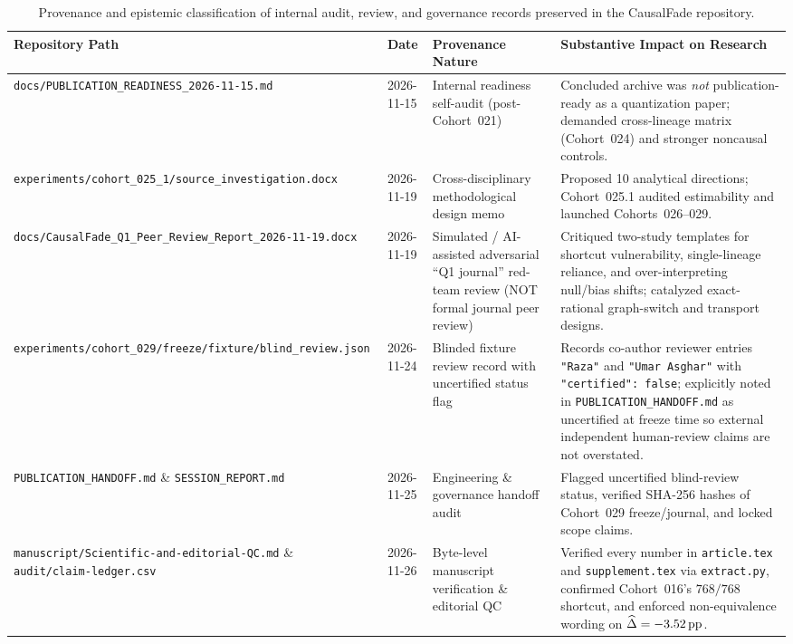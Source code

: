 \begin{table}[htbp]
\centering
\footnotesize
\caption{Provenance and epistemic classification of internal audit, review, and governance records preserved in the CausalFade repository.}\label{tab:audit_provenance}
\begin{tabular}{@{}p{4.3cm}p{1.8cm}p{3.0cm}p{4.8cm}@{}}
\toprule
\textbf{Repository Path} & \textbf{Date} & \textbf{Provenance Nature} & \textbf{Substantive Impact on Research} \\
\midrule
\texttt{docs/PUBLICATION\_READINESS\_2026-11-15.md} & 2026-11-15 & Internal readiness self-audit (post-Cohort~021) & Concluded archive was \emph{not} publication-ready as a quantization paper; demanded cross-lineage matrix (Cohort~024) and stronger noncausal controls. \\[3pt]
\texttt{experiments/cohort\_025\_1/source\_investigation.docx} & 2026-11-19 & Cross-disciplinary methodological design memo & Proposed 10 analytical directions; Cohort~025.1 audited estimability and launched Cohorts~026--029. \\[3pt]
\texttt{docs/CausalFade\_Q1\_Peer\_Review\_Report\_2026-11-19.docx} & 2026-11-19 & Simulated / AI-assisted adversarial ``Q1 journal'' red-team review (NOT formal journal peer review) & Critiqued two-study templates for shortcut vulnerability, single-lineage reliance, and over-interpreting null/bias shifts; catalyzed exact-rational graph-switch and transport designs. \\[3pt]
\texttt{experiments/cohort\_029/freeze/fixture/blind\_review.json} & 2026-11-24 & Blinded fixture review record with uncertified status flag & Records co-author reviewer entries \texttt{"Raza"} and \texttt{"Umar Asghar"} with \texttt{"certified": false}; explicitly noted in \texttt{PUBLICATION\_HANDOFF.md} as uncertified at freeze time so external independent human-review claims are not overstated. \\[3pt]
\texttt{PUBLICATION\_HANDOFF.md} \& \texttt{SESSION\_REPORT.md} & 2026-11-25 & Engineering \& governance handoff audit & Flagged uncertified blind-review status, verified SHA-256 hashes of Cohort~029 freeze/journal, and locked scope claims. \\[3pt]
\texttt{manuscript/Scientific-and-editorial-QC.md} \& \texttt{audit/claim-ledger.csv} & 2026-11-26 & Byte-level manuscript verification \& editorial QC & Verified every number in \texttt{article.tex} and \texttt{supplement.tex} via \texttt{extract.py}, confirmed Cohort~016's $768/768$ shortcut, and enforced non-equivalence wording on $\widehat{\Delta} = -3.52\,\mathrm{pp}$. \\
\bottomrule
\end{tabular}
\end{table}

